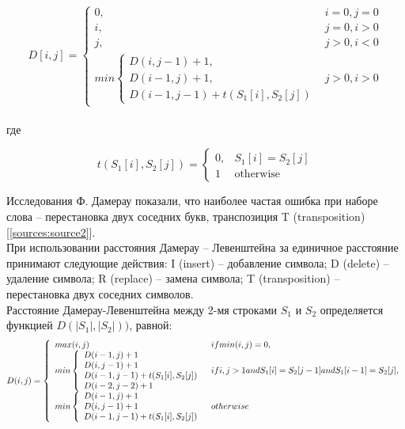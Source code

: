 \documentclass[a4paper,12pt]{article}
\begin{document}
\begin{displaymath}
D[i,j] = \left\{
\begin{array}{ll}
0, & i = 0, j = 0 \\
i, & j = 0, i > 0 \\
j, & j > 0, i < 0 \\
min\left\{
\begin{array}{ll}
D(i,j - 1) + 1, \\
D(i - 1,j) + 1, \\
D(i - 1,j - 1) + t(S_1[i],S_2[j])
\end{array}
\right.
& j > 0, i > 0
\end{array}
\right.
\end{displaymath}
\\
где

\begin{displaymath}
t(S_1[i],S_2[j]) = \left\{
\begin{array}{ll}
0, & S_1[i] = S_2[j] \\
1 & \text{otherwise}
\end{array}
\right.
\end{displaymath}

Исследования Ф. Дамерау показали, что наиболее частая ошибка при наборе слова – перестановка двух соседних букв, транспозиция T (transposition)[\ref{sources:source2}]. \\
При использовании расстояния Дамерау   –   Левенштейна за единичное расстояние принимают следующие действия: I (insert) – добавление символа;  D  (delete) – удаление символа;  R  (replace) – замена символа;  T  (transposition) – перестановка двух соседних символов.  \\

Расстояние Дамерау-Левенштейна между 2-мя строками $S_1$ и $S_2$ определяется функцией $D(|S_1|,|S_2|))$, равной:
\begin{displaymath}
D(i,j) = \left\{
\begin{array}{ll}
max(i,j) & if min(i,j) = 0, \\
min\left\{
\begin{array}{l}
D(i-1,j)+1\\
D(i,j-1)+1\\
D(i-1,j-1) + t(S_1[i],S_2[j])\\
D(i-2,j-2) + 1\\
\end{array}
\right. & if i,j>1 and S_1[i]=S_2[j-1] \linebreak and S_1[i-1]=S_2[j], \\
min\left\{
\begin{array}{l}
D(i-1,j)+1\\
D(i,j-1)+1\\
D(i-1,j-1) + t(S_1[i],S_2[j])\\
\end{array}
\right. & otherwise \\
\end{array}
\right.
\end{displaymath}
\end{document}
